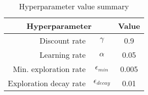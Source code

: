 \begin{table}[H]
  \centering
  \begin{tabular}[t]{| r | c | c |}
    \hline
    \multicolumn{2}{|c|}{\textbf{Hyperparameter}} & \textbf{Value} \\
    \hline
    Discount rate & $\gamma$ & 0.9 \\
    Learning rate & $\alpha$ & 0.05 \\
    Min. exploration rate & $\epsilon_{min}$ & 0.005\\
    Exploration decay rate & $\epsilon_{decay}$ & 0.01\\
    \hline
  \end{tabular}
  \caption{Hyperparameter value summary}
\end{table}